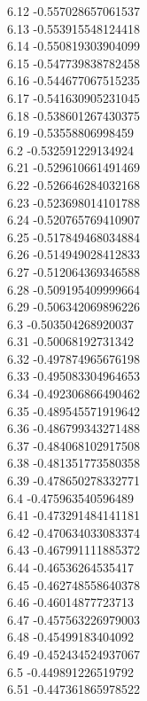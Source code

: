 {6.12	-0.557028657061537\\
6.13	-0.553915548124418\\
6.14	-0.550819303904099\\
6.15	-0.547739838782458\\
6.16	-0.544677067515235\\
6.17	-0.541630905231045\\
6.18	-0.538601267430375\\
6.19	-0.53558806998459\\
6.2	-0.532591229134924\\
6.21	-0.529610661491469\\
6.22	-0.526646284032168\\
6.23	-0.523698014101788\\
6.24	-0.520765769410907\\
6.25	-0.517849468034884\\
6.26	-0.514949028412833\\
6.27	-0.512064369346588\\
6.28	-0.509195409999664\\
6.29	-0.506342069896226\\
6.3	-0.503504268920037\\
6.31	-0.50068192731342\\
6.32	-0.497874965676198\\
6.33	-0.495083304964653\\
6.34	-0.492306866490462\\
6.35	-0.489545571919642\\
6.36	-0.486799343271488\\
6.37	-0.484068102917508\\
6.38	-0.481351773580358\\
6.39	-0.478650278332771\\
6.4	-0.475963540596489\\
6.41	-0.473291484141181\\
6.42	-0.470634033083374\\
6.43	-0.467991111885372\\
6.44	-0.46536264535417\\
6.45	-0.462748558640378\\
6.46	-0.46014877723713\\
6.47	-0.457563226979003\\
6.48	-0.45499183404092\\
6.49	-0.452434524937067\\
6.5	-0.449891226519792\\
6.51	-0.447361865978522\\
}
